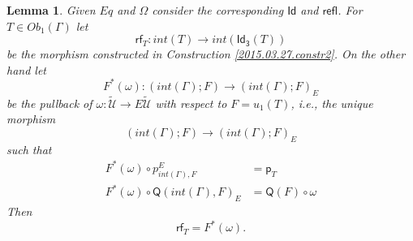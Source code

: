 \documentclass[12pt]{article}
\numberwithin{equation}{section}
\newtheorem{lemma}[proposition]{Lemma}
\newcommand{\sr}{\rightarrow}
\newcommand{\wt}{\widetilde}
\newcommand{\p}{\mathsf{p}}
\newcommand{\Id}{\mathsf{Id}} %
\newcommand{\Idx}{\mathsf{Id_3}} %
\newcommand{\refl}{\mathsf{refl}}
\newcommand{\U}{\mathcal{U}}
\newcommand{\rf}{\mathsf{rf}}
\newcommand{\Q}{\mathsf{Q}}
\begin{document}
\begin{lemma}
\label{2015.03.31.l2} Given $Eq$ and $\Omega$ consider the corresponding $\Id$
and $\refl$. For $T\in Ob_1(\Gamma)$ let %
$$\rf_T:int(T)\sr int(\Idx(T))$$
%
be the morphism constructed in Construction \ref{2015.03.27.constr2}. On the
other hand let
%
$$F^*(\omega):(int(\Gamma);F)\sr (int(\Gamma);F)_{E}$$
%
be the pullback of $\omega:\wt{\U}\sr E\wt{\U}$ with respect to $F=u_1(T)$,
i.e., the unique morphism
%
$$(int(\Gamma);F)\sr (int(\Gamma);F)_{E}$$
%
such that
%
\begin{align*}
  F^*(\omega)\circ p^{E}_{int(\Gamma),F} & = \p_{T} \\
  F^*(\omega)\circ \Q(int(\Gamma),F)_{E} & = \Q(F)\circ \omega
\end{align*}
%
Then
%
\[\rf_T=F^*(\omega).\]
%
\end{lemma}
%
\end{document}
